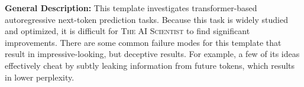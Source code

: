 \documentclass[11pt, a4paper]{include/gdm_format}
\newcommand{\ouralgo}{\textsc{The AI Scientist}\xspace}
\begin{document}
\begin{table}[!h]
\centering
\caption{\textbf{Evaluation of automated AI Scientist paper generation for Language Modeling.}}
\label{tab:nlp_papers}
%
\end{table}

\textbf{General Description:} This template investigates transformer-based~\citep{vaswani2017attention} autoregressive next-token prediction tasks. Because this task is widely studied and optimized, it is difficult for \ouralgo to find significant improvements. There are some common failure modes for this template that result in impressive-looking, but deceptive results. For example, a few of its ideas effectively cheat by subtly leaking information from future tokens, which results in lower perplexity.
\end{document}
